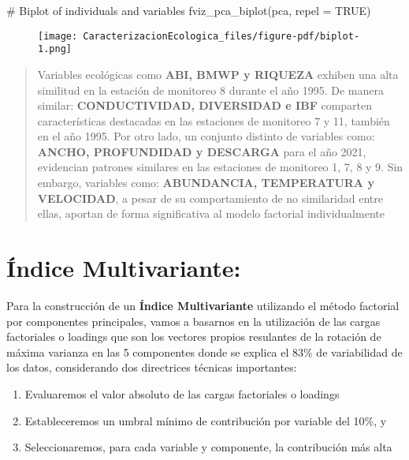 \documentclass[
  10pt,
  letterpaper,
  DIV=11,
  numbers=noendperiod]{scrreprt}
\newenvironment{Shaded}{\begin{snugshade}}{\end{snugshade}}
\newcommand{\AttributeTok}[1]{\textcolor[rgb]{0.40,0.45,0.13}{#1}}
\newcommand{\CommentTok}[1]{\textcolor[rgb]{0.37,0.37,0.37}{#1}}
\newcommand{\ConstantTok}[1]{\textcolor[rgb]{0.56,0.35,0.01}{#1}}
\newcommand{\FunctionTok}[1]{\textcolor[rgb]{0.28,0.35,0.67}{#1}}
\newcommand{\NormalTok}[1]{\textcolor[rgb]{0.00,0.23,0.31}{#1}}
\providecommand{\tightlist}{%
  \setlength{\itemsep}{0pt}\setlength{\parskip}{0pt}}\usepackage{longtable,booktabs,array}
\begin{document}
\begin{Shaded}
\begin{Highlighting}[numbers=left,,]
\CommentTok{\# Biplot of individuals and variables}
\FunctionTok{fviz\_pca\_biplot}\NormalTok{(pca, }\AttributeTok{repel =} \ConstantTok{TRUE}\NormalTok{)}
\end{Highlighting}
\end{Shaded}

\begin{figure}[tb]

{\centering \texttt{[image: CaracterizacionEcologica\_files/figure-pdf/biplot-1.png]}

}

\end{figure}

\begin{quote}
Variables ecológicas como \textbf{ABI, BMWP y RIQUEZA} exhiben una alta
similitud en la estación de monitoreo 8 durante el año 1995. De manera
similar: \textbf{CONDUCTIVIDAD, DIVERSIDAD e IBF} comparten
características destacadas en las estaciones de monitoreo 7 y 11,
también en el año 1995. Por otro lado, un conjunto distinto de variables
como: \textbf{ANCHO, PROFUNDIDAD y DESCARGA} para el año 2021,
evidencian patrones similares en las estaciones de monitoreo 1, 7, 8 y
9. Sin embargo, variables como: \textbf{ABUNDANCIA, TEMPERATURA y
VELOCIDAD}, a pesar de su comportamiento de no similaridad entre ellas,
aportan de forma significativa al modelo factorial individualmente
\end{quote}

\hypertarget{uxedndice-multivariante}{%
\chapter{Índice Multivariante:}\label{uxedndice-multivariante}}

Para la construcción de un \textbf{Índice Multivariante} utilizando el
método factorial por componentes principales, vamos a basarnos en la
utilización de las cargas factoriales o loadings que son los vectores
propios resulantes de la rotación de máxima varianza en las 5
componentes donde se explica el 83\% de variabilidad de los datos,
considerando dos directrices técnicas importantes:

\begin{enumerate}
\def\labelenumi{\arabic{enumi}.}
\tightlist
\item
  Evaluaremos el valor absoluto de las cargas factoriales o loadings
\item
  Estableceremos un umbral mínimo de contribución por variable del 10\%,
  y
\item
  Seleccionaremos, para cada variable y componente, la contribución más
  alta
\end{enumerate}
\end{document}

